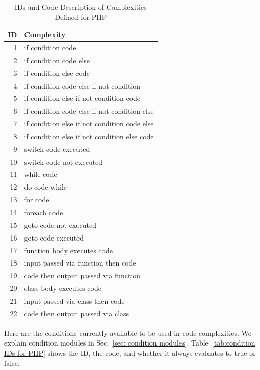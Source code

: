 \documentclass[12pt]{article}
\begin{document}
\begin{table}[H]
\centering
\begin{tabular}{|r|l|}
\hline
\textbf{ID} & \textbf{Complexity} \\
\hline
 1 & if condition code \\
\hline
 2 & if condition code else \\
\hline
 3 & if condition else code \\
\hline
 4 & if condition code else if not condition \\
\hline
 5 & if condition else if not condition code \\
\hline
 6 & if condition code else if not condition else \\
\hline
 7 & if condition else if not condition code else \\
 \hline
 8 & if condition else if not condition else code \\
\hline
 9 & switch code executed \\
\hline
10 & switch code not executed \\
\hline
11 & while code \\
\hline

12 & do code while \\
\hline
13 & for code \\
\hline
14 & foreach code \\
\hline
15 & goto code not executed \\
\hline
16 & goto code executed \\
\hline
17 & function body executes code \\
\hline
18 & input passed via function then code \\
\hline
19 & code then output passed via function \\
\hline
20 & class body executes code \\
\hline
21 & input passed via class then code \\
\hline
22 & code then output passed via class \\
\hline
\end{tabular}
\caption{IDs and Code Description of Complexities Defined for PHP}
\label{tab:complexity IDs for PHP}
\end{table}


Here are the conditions currently available to be used in code complexities.
We explain condition modules in Sec.~\ref{sec: condition modules}.
Table~\ref{tab:condition IDs for PHP} shows the ID, the code, and whether it
always evaluates to true or false.
\end{document}

